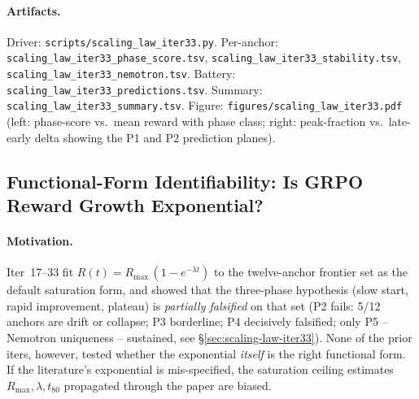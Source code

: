 \documentclass{article}
\begin{document}
\paragraph{Artifacts.}
Driver: \texttt{scripts/scaling\_law\_iter33.py}.
Per-anchor: \texttt{scaling\_law\_iter33\_phase\_score.tsv},
\texttt{scaling\_law\_iter33\_stability.tsv},
\texttt{scaling\_law\_iter33\_nemotron.tsv}.
Battery: \texttt{scaling\_law\_iter33\_predictions.tsv}.
Summary: \texttt{scaling\_law\_iter33\_summary.tsv}.
Figure: \texttt{figures/scaling\_law\_iter33.pdf} (left:
phase-score vs.\ mean reward with phase class; right: peak-fraction
vs.\ late-early delta showing the P1 and P2 prediction planes).
 \subsection{Functional-Form Identifiability: Is GRPO Reward Growth Exponential?}
\label{sec:scaling-law-iter37}


\paragraph{Motivation.}
Iter~17--33 fit $R(t) = R_{\max}\,(1 - e^{-\lambda t})$ to the twelve-anchor
frontier set as the default saturation form, and showed that the
three-phase hypothesis (slow start, rapid improvement, plateau) is
\emph{partially falsified} on that set (P2 fails: 5/12 anchors are drift
or collapse; P3 borderline; P4 decisively falsified; only P5 -- Nemotron
uniqueness -- sustained, see \S\ref{sec:scaling-law-iter33}). None of
the prior iters, however, tested whether the exponential
\emph{itself} is the right functional form. If the literature's
exponential is mis-specified, the saturation ceiling estimates
$R_{\max}, \lambda, t_{80}$ propagated through the paper are biased.
\end{document}
